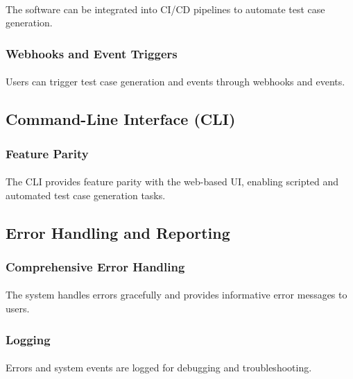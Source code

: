 \documentclass{article}
\begin{document}
\paragraph{}
The software can be integrated into CI/CD pipelines to automate test case generation.

\subsubsection{Webhooks and Event Triggers}
\paragraph{}
Users can trigger test case generation and events through webhooks and events.

\subsection{Command-Line Interface (CLI)}
\subsubsection{Feature Parity}
\paragraph{}
The CLI provides feature parity with the web-based UI, enabling scripted and
automated test case generation tasks.

\subsection{Error Handling and Reporting}
\subsubsection{Comprehensive Error Handling}
\paragraph{}
The system handles errors gracefully and provides informative error messages to users.

\subsubsection{Logging}
\paragraph{}
Errors and system events are logged for debugging and troubleshooting.
\end{document}
